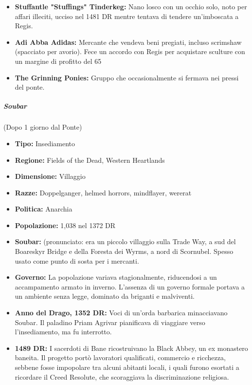 \documentclass{article}
\begin{document}
\begin{itemize}
                    \item \textbf{Stuffantle "Stuffings" Tinderkeg:} Nano losco con un occhio solo, noto per affari illeciti, ucciso nel 1481 DR mentre tentava di tendere un'imboscata a Regis.
                    \item \textbf{Adi Abba Adidas:} Mercante che vendeva beni pregiati, incluso scrimshaw (spacciato per avorio). Fece un accordo con Regis per acquistare sculture con un margine di profitto del 65%
                    \item \textbf{The Grinning Ponies:} Gruppo che occasionalmente si fermava nei pressi del ponte.
                \end{itemize}

                \subparagraph{Soubar}
                (Dopo 1 giorno dal Ponte)
\begin{itemize}
    \item \textbf{Tipo:} Insediamento
    \item \textbf{Regione:} Fields of the Dead, Western Heartlands
    \item \textbf{Dimensione:} Villaggio
    \item \textbf{Razze:} Doppelganger, helmed horrors, mindflayer, wererat
    \item \textbf{Politica:} Anarchia
    \item \textbf{Popolazione:} 1,038 nel 1372 DR
    \item \textbf{Soubar:} (pronunciato: era un piccolo villaggio sulla Trade Way, a sud del Boareskyr Bridge e della Foresta dei Wyrms, a nord di Scornubel. Spesso usato come punto di sosta per i mercanti.
    \item \textbf{Governo:} La popolazione variava stagionalmente, riducendosi a un accampamento armato in inverno. L'assenza di un governo formale portava a un ambiente senza legge, dominato da briganti e malviventi.
    \item \textbf{Anno del Drago, 1352 DR:} Voci di un'orda barbarica minacciavano Soubar. Il paladino Priam Agrivar pianificava di viaggiare verso l'insediamento, ma fu interrotto.
    \item \textbf{1489 DR:} I sacerdoti di Bane ricostruivano la Black Abbey, un ex monastero baneita. Il progetto portò lavoratori qualificati, commercio e ricchezza, sebbene fosse impopolare tra alcuni abitanti locali, i quali furono esortati a ricordare il Creed Resolute, che scoraggiava la discriminazione religiosa.
\end{itemize}
\end{document}

